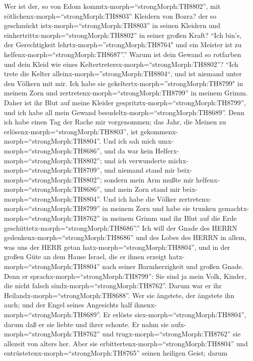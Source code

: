  Wer ist der, so von Edom
kommtx-morph=``strongMorph:TH8802'', mit
rötlichenx-morph=``strongMorph:TH8803'' Kleidern von Bozra? der so
geschmückt istx-morph=``strongMorph:TH8803'' in seinen Kleidern und
einhertrittx-morph=``strongMorph:TH8802'' in seiner großen Kraft? ``Ich
bin's, der Gerechtigkeit lehrtx-morph=''strongMorph:TH8764" und ein
Meister ist zu helfenx-morph=``strongMorph:TH8687''.'' 
Warum ist dein Gewand so rotfarben und dein Kleid wie eines
Keltertretersx-morph=``strongMorph:TH8802''?  ``Ich trete
die Kelter alleinx-morph=''strongMorph:TH8804``, und ist niemand unter
den Völkern mit mir. Ich habe sie gekeltertx-morph=''strongMorph:TH8799"
in meinem Zorn und zertretenx-morph=``strongMorph:TH8799'' in meinem
Grimm. Daher ist ihr Blut auf meine Kleider
gespritztx-morph=``strongMorph:TH8799'', und ich habe all mein Gewand
besudeltx-morph=``strongMorph:TH8689''.  Denn ich habe einen
Tag der Rache mir vorgenommen; das Jahr, die Meinen zu
erlösenx-morph=``strongMorph:TH8803'', ist
gekommenx-morph=``strongMorph:TH8804''.  Und ich sah mich
umx-morph=``strongMorph:TH8686'', und da war kein
Helferx-morph=``strongMorph:TH8802''; und ich verwunderte
michx-morph=``strongMorph:TH8709'', und niemand stand mir
beix-morph=``strongMorph:TH8802''; sondern mein Arm mußte mir
helfenx-morph=``strongMorph:TH8686'', und mein Zorn stand mir
beix-morph=``strongMorph:TH8804''.  Und ich habe die Völker
zertretenx-morph=``strongMorph:TH8799'' in meinem Zorn und habe sie
trunken gemachtx-morph=``strongMorph:TH8762'' in meinem Grimm und ihr
Blut auf die Erde geschüttetx-morph=``strongMorph:TH8686''.''
 Ich will der Gnade des HERRN
gedenkenx-morph=``strongMorph:TH8686'' und des Lobes des HERRN in allem,
was uns der HERR getan hatx-morph=``strongMorph:TH8804'', und in der
großen Güte an dem Hause Israel, die er ihnen erzeigt
hatx-morph=``strongMorph:TH8804'' nach seiner Barmherzigkeit und großen
Gnade.  Denn er sprachx-morph=``strongMorph:TH8799'': Sie
sind ja mein Volk, Kinder, die nicht falsch
sindx-morph=``strongMorph:TH8762''. Darum war er ihr
Heilandx-morph=``strongMorph:TH8688''.  Wer sie ängstete,
der ängstete ihn auch; und der Engel seines Angesichts half
ihnenx-morph=``strongMorph:TH8689''. Er erlöste
siex-morph=``strongMorph:TH8804'', darum daß er sie liebte und ihrer
schonte. Er nahm sie aufx-morph=``strongMorph:TH8762'' und
trugx-morph=``strongMorph:TH8762'' sie allezeit von alters her.
 Aber sie erbittertenx-morph=``strongMorph:TH8804'' und
entrüstetenx-morph=``strongMorph:TH8765'' seinen heiligen Geist; darum
